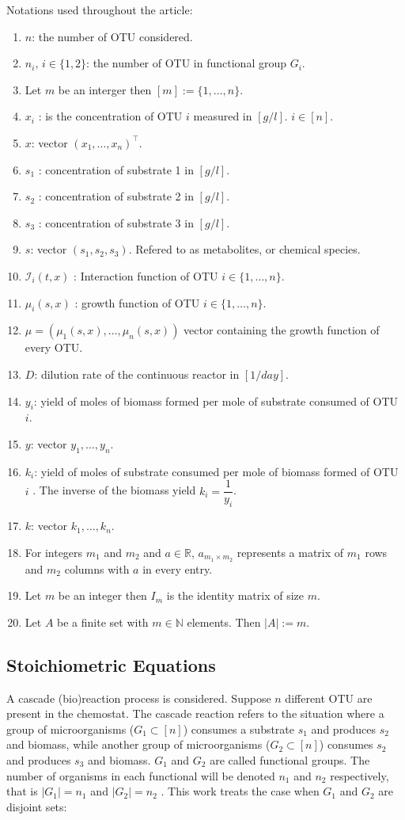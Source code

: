 \documentclass[3p,times]{elsarticle}
\newcommand{\N}{\mathbb{N}}
\newcommand{\R}{\mathbb{R}}
\newcommand{\I}{\mathcal{I}}
\begin{document}
Notations used throughout the article:
\begin{enumerate}
	\item $n$: the number of OTU considered.
	\item $n_i, \, i \in \{1,2\}$: the number of OTU in functional group $G_i$.
	\item Let $m$ be an interger then $[m]:=\{1,\dots,n \}$. 
	\item $x_i$ :  is the concentration of OTU $i$ measured in $[g/l]$. $i \in [n]$. 
	\item $x$: vector $(x_1,\dots,x_n)^\top$.
	\item $s_1$ : concentration of substrate 1 in $[g/l]$.
	\item $s_2$ : concentration of substrate 2 in $[g/l]$. 
	\item $s_3$ : concentration of substrate 3 in $[g/l]$.
	\item $s$:  vector $(s_1,s_2,s_3)$. Refered to as metabolites, or chemical species.
	\item $\I_i(t,x)$ : Interaction function of OTU $i \in \{1,\dots,n\}$.
	\item $\mu_i(s,x)$ : growth function of OTU $i \in \{1,\dots,n\}$.
	\item $\mu = (\mu_1(s,x), \dots, \mu_n(s,x))$ vector containing the growth function of every OTU.
	\item $D$: dilution rate of the continuous reactor in $[1/day]$. 
	\item $y_i$: yield of moles of biomass formed per mole of substrate consumed of OTU $i$.
	\item $y$: vector $y_1,\dots,y_n$.
	\item $k_i$: yield of  moles of substrate consumed per mole of biomass formed of OTU $i$ . The inverse of the biomass yield $k_i = \dfrac{1}{y_i}$.
	\item $k$: vector $k_1,\dots,k_n$.
	\item For integers $m_1$ and $m_2$ and $a \in \R$, $a_{m_1 \times m_2}$ represents a matrix of $m_1$ rows and $m_2$ columns with $a$ in every entry. 
	\item Let $m$ be an integer then $I_m$ is the identity matrix of size $m$.
	\item Let $A$ be a finite set with $m \in \N$ elements. Then $\vert A \vert := m$. 
\end{enumerate}

\subsection{Stoichiometric Equations}
A cascade (bio)reaction process is considered. Suppose $n$ different OTU are present in the chemostat. The cascade reaction refers to the situation where a group of microorganisms ($G_1 \subset [n] $) consumes a substrate $s_1$ and produces $s_2$ and biomass, while another group of microorganisms ($G_2\subset [n]$) consumes $s_2$ and produces $s_3$ and biomass. $G_1$ and $G_2$ are called functional groups. The number of organisms in each functional will be denoted $n_1$ and $n_2$ respectively, that is $\vert G_1 \vert = n_1$ and $\vert G_2 \vert = n_2$ . This work treats the case when $G_1$ and $G_2$ are disjoint sets:
\end{document}
